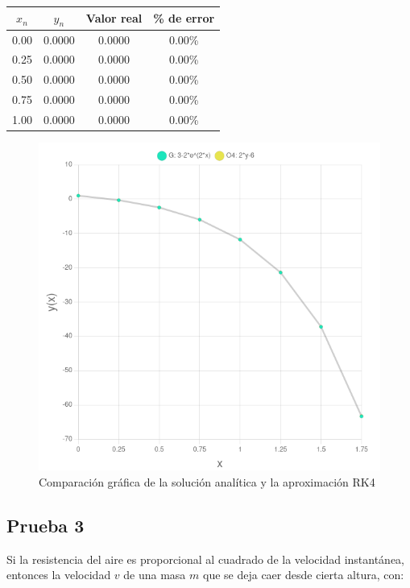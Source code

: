 \documentclass[article, 11pt]{IEEEtran}   %
\begin{document}
\begin{table}[H]
\centering
\begin{tabular}{|c|c|c|c|}
\hline
$x_n$ & $y_n$ & Valor real & \% de error \\
\hline
0.00 & 0.0000 & 0.0000 & 0.00\%\\
0.25 & 0.0000 & 0.0000 & 0.00\%\\
0.50 & 0.0000 & 0.0000 & 0.00\%\\
0.75 & 0.0000 & 0.0000 & 0.00\%\\
1.00 & 0.0000 & 0.0000 & 0.00\%\\
\hline   
\end{tabular}
\end{table}

\begin{figure}[H]									%
\centering
\includegraphics[scale=0.35]{graficaPrueba2}%
\caption{Comparación gráfica de la solución analítica y la aproximación RK4}\label{diagram2}  %
\end{figure}

\subsection{Prueba 3}
Si la resistencia del aire es proporcional al cuadrado de la velocidad instantánea, entonces la velocidad $v$ de una masa $m$ que se deja caer desde cierta altura, con:
\end{document}
